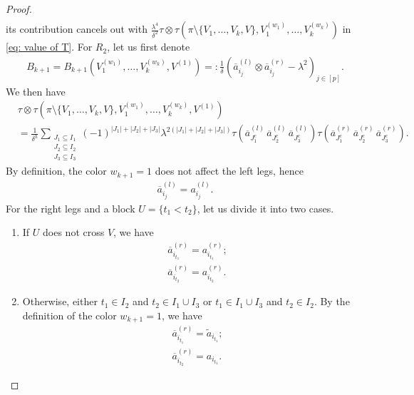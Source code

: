 \documentclass[12pt,reqno]{amsart}
\theoremstyle{plain}
\newcommand{\1}{\mathbf{1}}
\begin{document}
\begin{proof}
\begin{align*}
    \end{align*}
    its contribution cancels out with $\frac{\lambda^4}{\delta^2}\tau\otimes \tau\left(\pi\setminus\{V_1,\ldots,V_k,V\},V_1^{(w_1)},\ldots,V_k^{(w_k)}\right)$ in \eqref{eq: value of T}. For $R_2$, let us first denote
    \begin{align*}
        B_{k+1}=B_{k+1}\left(V_1^{(w_1)},\ldots,V_{k}^{(w_k)},V^{(1)}\right)=:\frac{1}{\delta}\left(\overline{a}_{i_j}^{(l)}\otimes \overline{a}_{i_j}^{(r)}-\lambda^2\right)_{j \in [p]}.
    \end{align*}
    We then have
    \begin{align*}
        &\tau\otimes\tau\left(\pi\setminus\{V_1,\ldots,V_k,V\},V_1^{(w_1)},\ldots,V_{k}^{(w_k)},V^{(1)}\right)\\
        &=\frac{1}{\delta^h}\sum_{\substack{J_1 \subseteq I_1\\ J_2 \subseteq I_2\\ J_3 \subseteq I_3}}(-1)^{|J_1|+|J_2|+|J_3|}\lambda^{2(|J_1|+|J_2|+|J_3|)}\tau\left(\overline{a}_{J_1^c}^{(l)}\, \overline{a}_{J_2^c}^{(l)}\, \overline{a}_{J_3^c}^{(l)}\right)\tau\left(\overline{a}_{J_1^c}^{(r)}\, \overline{a}_{J_2^c}^{(r)}\, \overline{a}_{J_3^c}^{(r)}\right).
    \end{align*}
    By definition, the color $w_{k+1}=1$ does not affect the left legs, hence
    \begin{align*}
        \overline{a}_{i_j}^{(l)}=a_{i_j}^{(l)}.
    \end{align*}
    For the right legs and a block $U=\{t_1<t_2\}$, let us divide it into two cases.
    \begin{enumerate}
        \item\label{case 1} If $U$ does not cross $V$, we have
        \begin{align*}
            &\overline{a}_{i_{t_1}}^{(r)}=a_{i_{t_1}}^{(r)};\\
            &\overline{a}_{i_{t_2}}^{(r)}=a_{i_{t_2}}^{(r)}.
        \end{align*}
        \item\label{case 2} Otherwise, either $t_1 \in I_2$ and $t_2 \in I_1\cup I_3$ or $t_1 \in I_1 \cup I_3$ and $t_2 \in I_2$. By the definition of the color $w_{k+1}=1$, we have
        \begin{align*}
            &\overline{a}_{i_{t_1}}^{(r)}=\tilde{a}_{i_{t_1}};\\
            &\overline{a}_{i_{t_2}}^{(r)}=a_{i_{t_1}}.
        \end{align*}
    \end{enumerate}

\end{proof}
\end{document}
